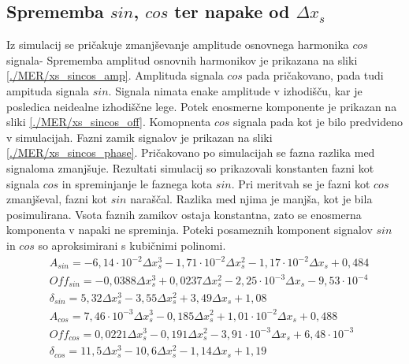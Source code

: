 \subsection{Sprememba $sin$, $cos$ ter napake od $\Delta x_s$}
Iz simulacij se pričakuje zmanjševanje amplitude osnovnega harmonika $cos$ signala- Sprememba amplitud osnovnih harmonikov je prikazana na sliki \ref{./MER/xs_sincos_amp}. Amplituda signala $cos$ pada pričakovano, pada tudi ampituda signala $sin$. Signala nimata enake amplitude v izhodišču, kar je posledica neidealne izhodiščne lege. Potek enosmerne komponente je prikazan na sliki \ref{./MER/xs_sincos_off}. Komopnenta $cos$ signala pada kot je bilo predvideno v simulacijah. Fazni zamik signalov je prikazan na sliki \ref{./MER/xs_sincos_phase}. Pričakovano po simulacijah se fazna razlika med signaloma zmanjšuje. Rezultati simulacij so prikazovali konstanten fazni kot signala $cos$ in spreminjanje le faznega kota $sin$. Pri meritvah se je fazni kot $cos$ zmanjševal, fazni kot $sin$ naraščal. Razlika med njima je manjša, kot je bila posimulirana. Vsota faznih zamikov ostaja konstantna, zato se enosmerna komponenta v napaki ne spreminja.
Poteki posameznih komponent signalov $sin$ in $cos$ so aproksimirani s kubičnimi polinomi.
\begin{eqnarray}
&A_{sin} = -6,14\cdot 10^{-2}\Delta x_s^3-1,71\cdot 10^{-2}\Delta x_s^2-1,17\cdot 10^{-2}\Delta x_s+0,484\\  
&Off_{sin} = -0,0388\Delta x_s^3+0,0237\Delta x_s^2-2,25\cdot 10^{-3}\Delta x_s-9,53\cdot 10^{-4}            \\
&\delta_{sin} = 5,32 \Delta x_s^3-3,55\Delta x_s^2+3,49\Delta x_s+1,08           \\ 
&A_{cos} = 7,46\cdot 10^{-3}\Delta x_s^3-0,185\Delta x_s^2+1,01\cdot 10^{-2}\Delta x_s+0,488\\  
&Off_{cos} = 0,0221\Delta x_s^3-0,191\Delta x_s^2-3,91\cdot 10^{-3}\Delta x_s+6,48\cdot 10^{-3}            \\
&\delta_{cos} = 11,5  \Delta x_s^3-10,6\Delta x_s^2-1,14\Delta x_s+1,19
\end{eqnarray}

